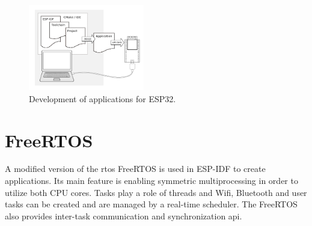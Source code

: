 \begin{figure}[h!]
    \centering
    \captionsetup{justification=centering,margin=0.5cm}
    \includegraphics[width=0.45\textwidth]{images/upload_process.png}
    \caption[Development of applications for ESP32]{Development of applications for ESP32.\cite{espidf2022}}
    \label{fig:upload_process}
\end{figure}

\section{FreeRTOS}

A modified version of the \gls{rtos} FreeRTOS is used in ESP-IDF to create applications. Its main feature is enabling symmetric multiprocessing in order to utilize both CPU cores. Tasks play a role of threads and Wifi, Bluetooth and user tasks can be created and are managed by a real-time scheduler. The FreeRTOS also provides inter-task communication and synchronization \gls{api}.\cite{espidf2022}
